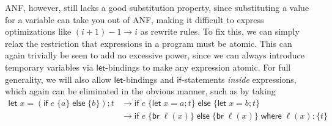 \documentclass[acmsmall,screen,review]{acmart}
\newcommand{\ms}[1]{\ensuremath{\mathsf{#1}}}
\begin{document}
ANF, however, still lacks a good substitution property, since substituting a value for a variable
can take you out of ANF, making it difficult to express optimizations like $(i + 1) - 1 \to i$ as
rewrite rules. To fix this, we can simply relax the restriction that expressions in a program must
be atomic. This can again trivially be seen to add no excessive power, since we can always introduce
temporary variables via \ms{let}-bindings to make any expression atomic. For full generality, we
will also allow \ms{let}-bindings and \ms{if}-statements \textit{inside} expressions, which again
can be eliminated in the obvious manner, such as by taking
\begin{align*}
  \ms{let}\;x = (\ms{if}\;e\;\{a\}\;\ms{else}\;\{b\}); t &
    \to \ms{if}\;e\;\{\ms{let}\;x = a; t\}\;\ms{else}\;\{\ms{let}\;x = b; t\} \\ 
  & \to \ms{if}\;e\;\{\ms{br}\;\ell(x)\}\;\ms{else}\;\{\ms{br}\;\ell(x)\}\;
        \ms{where}\;\ell(x): \{t\}
\end{align*}
\end{document}

